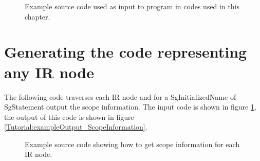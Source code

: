 \begin{figure}[!h]
{\indent
{\mySmallFontSize

\begin{latexonly}
   
\end{latexonly}

\begin{htmlonly}
   
\end{htmlonly}

}
}
\caption{Example source code used as input to program in
         codes used in this chapter.}
\label{Tutorial:exampleInputCode_ScopeInformation}
\end{figure}


\section{Generating the code representing any IR node}

    The following code traverses each IR node and for a 
SgInitializedName of SgStatement output the scope information.
The input code is shown in figure \ref{Tutorial:exampleInputCode_ScopeInformation},
the output of this code is shown in figure 
\ref{Tutorial:exampleOutput_ScopeInformation}.
    
\begin{figure}[!h]
{\indent
{\mySmallFontSize


\begin{latexonly}
   
\end{latexonly}

\begin{htmlonly}
   
\end{htmlonly}

}
}
\caption{Example source code showing how to get scope information for each IR node. }
\label{Tutorial:example_ScopeInformation}
\end{figure}



